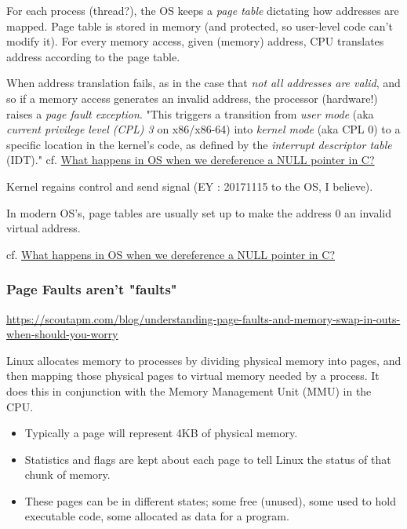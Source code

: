 \documentclass[10pt]{amsart}
\begin{document}
\begin{multicols*}{2}
For each process (thread?), the OS keeps a \emph{page table} dictating how addresses are mapped.  Page table is stored in memory (and protected, so user-level code can't modify it).  For every memory access, given (memory) address, CPU translates address according to the page table.  

When address translation fails, as in the case that \emph{not all addresses are valid}, and so if a memory access generates an invalid address, the processor (hardware!) raises a \emph{page fault exception}.  "This triggers a transition from \emph{user mode} (aka \emph{current privilege level (CPL) 3} on x86/x86-64) into \emph{kernel mode} (aka CPL 0) to a specific location in the kernel's code, as defined by the \emph{interrupt descriptor table} (IDT)."  cf. \href{https://stackoverflow.com/questions/12645647/what-happens-in-os-when-we-dereference-a-null-pointer-in-c}{What happens in OS when we dereference a NULL pointer in C?}


Kernel regains control and send signal (EY : 20171115 to the OS, I believe).   

In modern OS's, page tables are usually set up to make the address 0 an invalid virtual address.  

cf. \href{https://stackoverflow.com/questions/12645647/what-happens-in-os-when-we-dereference-a-null-pointer-in-c}{What happens in OS when we dereference a NULL pointer in C?}

\subsubsection{Page Faults aren't "faults"}

\url{https://scoutapm.com/blog/understanding-page-faults-and-memory-swap-in-outs-when-should-you-worry}

Linux allocates memory to processes by dividing physical memory into pages, and then mapping those physical pages to virtual memory needed by a process. It does this in conjunction with the Memory Management Unit (MMU) in the CPU.
\begin{itemize}
	\item Typically a page will represent 4KB of physical memory.
	\item Statistics and flags are kept about each page to tell Linux the status of that chunk of memory.
	\item These pages can be in different states; some free (unused), some used to hold executable code, some allocated as data for a program.
\end{itemize}


\end{multicols*}
\end{document}
